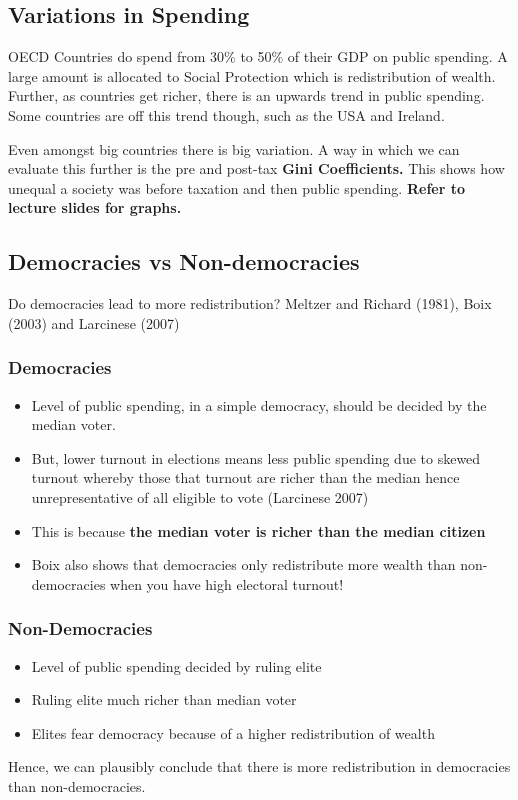 \documentclass[12pt, letterpaper]{article}
\begin{document}
\subsection{Variations in Spending}
OECD Countries do spend from 30\% to 50\% of their GDP on public spending. A large amount is allocated to Social Protection which is redistribution of wealth. Further, as countries get richer, there is an upwards trend in public spending. Some countries are off this trend though, such as the USA and Ireland.

Even amongst big countries there is big variation. A way in which we can evaluate this further is the pre and post-tax \textbf{Gini Coefficients.} This shows how unequal a society was before taxation and then public spending. \textbf{Refer to lecture slides for graphs.}

\subsection{Democracies vs Non-democracies}
Do democracies lead to more redistribution? Meltzer and Richard (1981), Boix (2003) and Larcinese (2007)
\subsubsection{Democracies}
\begin{itemize}
	\item Level of public spending, in a simple democracy, should be decided by the median voter.
	\item But, lower turnout in elections means less public spending due to skewed turnout whereby those that turnout are richer than the median hence unrepresentative of all eligible to vote (Larcinese 2007)
	\item This is because \textbf{the median voter is richer than the median citizen}
	\item Boix also shows that democracies only redistribute more wealth than non-democracies when you have high electoral turnout!
\end{itemize}

\subsubsection{Non-Democracies}
\begin{itemize}
	\item Level of public spending decided by ruling elite
	\item Ruling elite much richer than median voter
	\item Elites fear democracy because of a higher redistribution of wealth
\end{itemize}
Hence, we can plausibly conclude that there is more redistribution in democracies than non-democracies.
\end{document}
